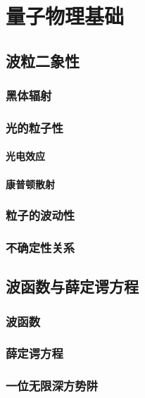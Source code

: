\chapter{量子物理基础}
\setcounter{example_counter}{1}

\section{波粒二象性}

\subsection{黑体辐射}

\subsection{光的粒子性}

\subsubsection{光电效应}

\subsubsection{康普顿散射}

\subsection{粒子的波动性}

\subsection{不确定性关系}

\section{波函数与薛定谔方程}

\subsection{波函数}

\subsection{薛定谔方程}

\subsection{一位无限深方势阱}

